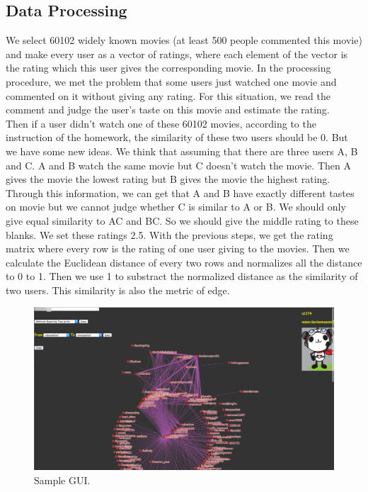 \documentclass{article}
\begin{document}
\subsection{Data Processing}
We select 60102 widely known movies (at least 500 people commented this movie) and make every user as a vector of ratings, where each element of the vector is the rating which this user gives the corresponding movie. In the processing procedure, we met the problem that some users just watched one movie and commented on it without giving any rating. For this situation, we read the comment and judge the user's taste on this movie and estimate the rating.  \\ 
Then if a user didn't watch one of these 60102 movies, according to the instruction of the homework, the similarity of these two users should be 0. But we have some new ideas. We think that assuming that there are three users A, B and C. A and B watch the same movie but C doesn't watch the movie. Then A gives the movie the lowest rating but B gives the movie the highest rating. Through this information, we can get that A and B have exactly different tastes on movie but we cannot judge whether C is similar to A or B. We should only give equal similarity to AC and BC. So we should give the middle rating to these blanks. We set these ratings 2.5.
With the previous steps, we get the rating matrix where every row is the rating of one user giving to the movies. Then we calculate the Euclidean distance of every two rows and normalizes all the distance to 0 to 1. Then we use 1 to substract the normalized distance as the similarity of two users. This similarity is also the metric of edge. \\

\begin{figure}[h]
  \centering
  \includegraphics[width=1.0\columnwidth]{sample.png}
  \caption{Sample GUI.}
  \label{fig:sample}
\end{figure}
\end{document}
